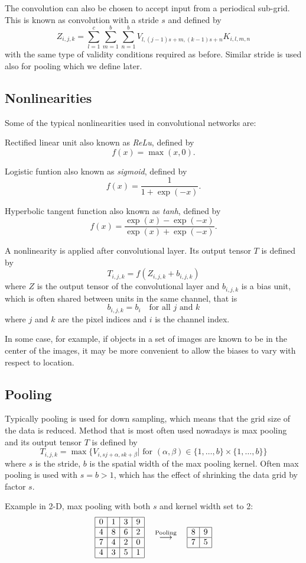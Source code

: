 \documentclass[]{article}
\begin{document}
The convolution can also be chosen to accept input from a periodical sub-grid.
This is known as convolution with a stride $s$ and defined by
\[
Z_{i, j, k} = \sum_{l=1}^c \sum_{m = 1}^b \sum_{n=1}^b
V_{l, (j -1) s + m, (k-1) s + n} K_{i, l, m, n}
\]
with the same type of validity conditions required as before. Similar stride is used
also for pooling which we define later.

\subsection{Nonlinearities}
Some of the typical nonlinearities used in convolutional networks are:

Rectified linear unit also known as \emph{ReLu}, defined by
\[
f(x) = \max(x, 0).
\]

Logistic funtion also known as \emph{sigmoid}, defined by
\[
f(x) = \frac{1}{1 + \exp(-x)}.
\]

Hyperbolic tangent function also known as \emph{tanh}, defined by
\[
f(x) = \frac{\exp(x) - \exp(-x)}{\exp(x) + \exp(-x)}.
\]

A nonlinearity is applied after convolutional layer. Its output tensor $T$ is defined by
\[
T_{i,j,k} = f(Z_{i, j, k} + b_{i,j,k})
\]
where $Z$ is the output tensor of the convolutional layer and $b_{i, j, k}$ is a
bias unit, which is often shared between units in the same channel, that is
\[
b_{i, j, k} = b_i \quad \text{for all $j$ and $k$}
\]
where $j$ and $k$ are the pixel indices and $i$ is the channel index.

In some case, for example, if objects in a set of images are known to be in the
center of the images, it may be more convenient to allow the biases to vary with
respect to location.

\subsection{Pooling}
Typically pooling is used for down sampling, which means that the grid size of
the data is reduced. Method that is most often used nowadays is max pooling and
its output tensor $T$ is defined by
\[
T_{i, j,k} = \max \{V_{i, s j + \alpha, s k + \beta} |
\text{ for $(\alpha, \beta) \in \{ 1,\ldots, b\} \times  \{ 1,\ldots, b\} $} \}
\]
where $s$ is the stride, $b$ is the spatial width of the max pooling kernel. Often
max pooling is used with $s = b > 1$, which has the effect of shrinking the data
grid by factor $s$.

Example in 2-D, max pooling with both $s$ and kernel width set to 2:
\[
\begin{array}{|c|c|c|c|}
  \hline
  0 & 1 & 3 & 9\\
  \hline
  4 & 8 & 6 & 2\\
  \hline
  7 & 4 & 2 & 0\\
  \hline
  4 & 3 & 5 & 1\\
  \hline
 \end{array}
 \quad \stackrel{\text{Pooling}}{\longrightarrow} \quad
 \begin{array}{|c|c|}
   \hline
   8 & 9\\
   \hline
   7 & 5\\
   \hline
  \end{array}
 \]
\end{document}
